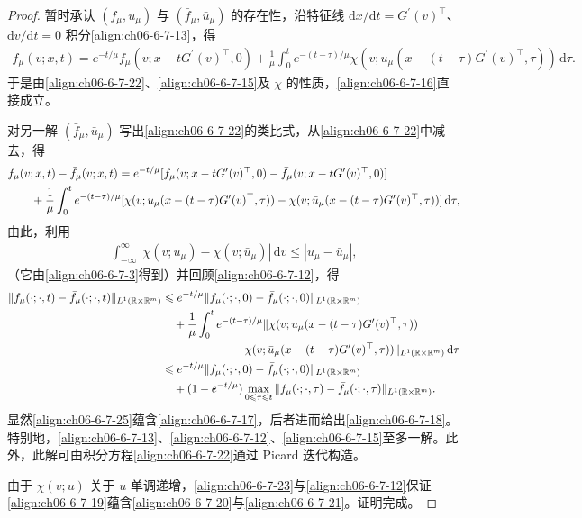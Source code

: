 \documentclass[../../main.tex]{subfiles}
\begin{document}
\begin{proof}
暂时承认 $(f_{\mu},u_{\mu})$ 与 $(\bar{f}_{\mu},\bar{u}_{\mu})$ 的存在性，沿特征线 $\mathrm{d}x/\mathrm{d}t=G^{\prime}(v)^{\top}$、$\mathrm{d}v/\mathrm{d}t=0$ 积分\eqref{align:ch06-6-7-13}，得
\begin{align}
f_{\mu}(v;x,t)=e^{-t/\mu}f_{\mu}(v;x-tG^{\prime}(v)^{\top},0)+\frac{1}{\mu}\int_{0}^{t}e^{-(t-\tau)/\mu}\chi(v;u_{\mu}(x-(t-\tau)G^{\prime}(v)^{\top},\tau))\,\mathrm{d}\tau.
\label{align:ch06-6-7-22}
\end{align}
于是由\eqref{align:ch06-6-7-22}、\eqref{align:ch06-6-7-15}及 $\chi$ 的性质，\eqref{align:ch06-6-7-16}直接成立。

对另一解 $(\bar{f}_{\mu},\bar{u}_{\mu})$ 写出\eqref{align:ch06-6-7-22}的类比式，从\eqref{align:ch06-6-7-22}中减去，得
\begin{align}
&f_{\mu}(v;x,t)-\bar{f}_{\mu}(v;x,t)=e^{-t/\mu}[f_{\mu}(v;x-tG^{\prime}(v)^{\top},0)-\bar{f}_{\mu}(v;x-tG^{\prime}(v)^{\top},0)]\notag\\
&\qquad+\frac{1}{\mu}\int_{0}^{t}e^{-(t-\tau)/\mu}[\chi(v;u_{\mu}(x-(t-\tau)G^{\prime}(v)^{\top},\tau))-\chi(v;\bar{u}_{\mu}(x-(t-\tau)G^{\prime}(v)^{\top},\tau))]\,\mathrm{d}\tau,
\label{align:ch06-6-7-23}
\end{align}
由此，利用
\begin{align}
\int_{-\infty}^{\infty}|\chi(v;u_{\mu})-\chi(v;\bar{u}_{\mu})|\,\mathrm{d}v\leqslant|u_{\mu}-\bar{u}_{\mu}|,
\label{align:ch06-6-7-24}
\end{align}
（它由\eqref{align:ch06-6-7-3}得到）并回顾\eqref{align:ch06-6-7-12}，得
\begin{align}
\|f_{\mu}(\cdot;\cdot,t)-\bar{f}_{\mu}(\cdot;\cdot,t)\|_{L^{1}(\mathbb{R}\times\mathbb{R}^{m})}
&\leqslant e^{-t/\mu}\|f_{\mu}(\cdot;\cdot,0)-\bar{f}_{\mu}(\cdot;\cdot,0)\|_{L^{1}(\mathbb{R}\times\mathbb{R}^{m})}\notag\\
&\quad+\frac{1}{\mu}\int_{0}^{t}e^{-(t-\tau)/\mu}\|\chi(v;u_{\mu}(x-(t-\tau)G^{\prime}(v)^{\top},\tau))\notag\\
&\qquad\qquad\qquad-\chi(v;\bar{u}_{\mu}(x-(t-\tau)G^{\prime}(v)^{\top},\tau))\|_{L^{1}(\mathbb{R}\times\mathbb{R}^{m})}\,\mathrm{d}\tau\notag\\
&\leqslant e^{-t/\mu}\|f_{\mu}(\cdot;\cdot,0)-\bar{f}_{\mu}(\cdot;\cdot,0)\|_{L^{1}(\mathbb{R}\times\mathbb{R}^{m})}\notag\\
&\quad+(1-e^{-t/\mu})\max_{0\leqslant\tau\leqslant t}\|f_{\mu}(\cdot;\cdot,\tau)-\bar{f}_{\mu}(\cdot;\cdot,\tau)\|_{L^{1}(\mathbb{R}\times\mathbb{R}^{m})}.
\label{align:ch06-6-7-25}
\end{align}
显然\eqref{align:ch06-6-7-25}蕴含\eqref{align:ch06-6-7-17}，后者进而给出\eqref{align:ch06-6-7-18}。特别地，\eqref{align:ch06-6-7-13}、\eqref{align:ch06-6-7-12}、\eqref{align:ch06-6-7-15}至多一解。此外，此解可由积分方程\eqref{align:ch06-6-7-22}通过 Picard 迭代构造。

由于 $\chi(v;u)$ 关于 $u$ 单调递增，\eqref{align:ch06-6-7-23}与\eqref{align:ch06-6-7-12}保证\eqref{align:ch06-6-7-19}蕴含\eqref{align:ch06-6-7-20}与\eqref{align:ch06-6-7-21}。证明完成。
\end{proof}
\end{document}
